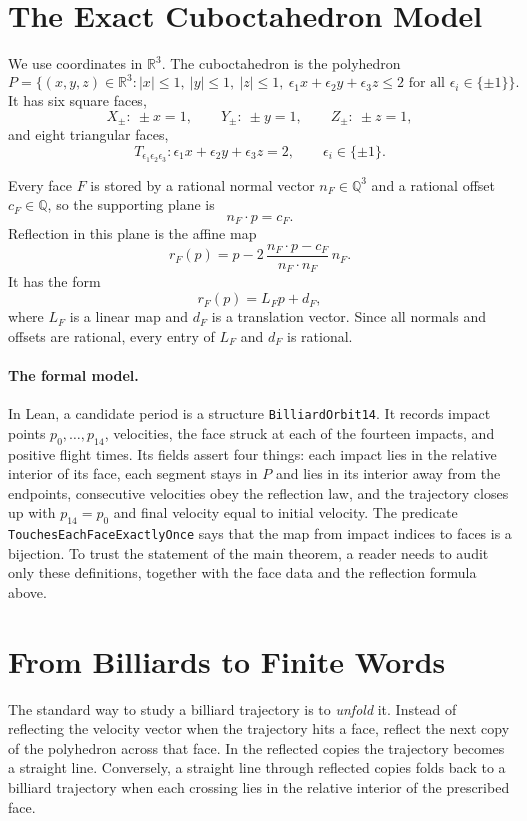 \documentclass[11pt]{article}
\newcommand{\R}{\mathbb{R}}
\newcommand{\Q}{\mathbb{Q}}
\newcommand{\dotp}{\mathbin{\cdot}}
\begin{document}
\section{The Exact Cuboctahedron Model}
\label{sec:model}

We use coordinates in \(\R^3\).  The cuboctahedron is the polyhedron
\[
P=\{(x,y,z)\in\R^3:
 |x|\le 1,\ |y|\le 1,\ |z|\le 1,\
 \epsilon_1x+\epsilon_2y+\epsilon_3z\le 2
 \text{ for all }\epsilon_i\in\{\pm1\}\}.
\]
It has six square faces,
\[
X_\pm:\ \pm x=1,\qquad
Y_\pm:\ \pm y=1,\qquad
Z_\pm:\ \pm z=1,
\]
and eight triangular faces,
\[
T_{\epsilon_1\epsilon_2\epsilon_3}:
\epsilon_1x+\epsilon_2y+\epsilon_3z=2,
\qquad \epsilon_i\in\{\pm1\}.
\]

Every face \(F\) is stored by a rational normal vector \(n_F\in\Q^3\) and a
rational offset \(c_F\in\Q\), so the supporting plane is
\[
  n_F\dotp p=c_F.
\]
Reflection in this plane is the affine map
\[
  r_F(p)=p-2\,\frac{n_F\dotp p-c_F}{n_F\dotp n_F}\,n_F.
\]
It has the form
\[
  r_F(p)=L_Fp+d_F,
\]
where \(L_F\) is a linear map and \(d_F\) is a translation vector.  Since all
normals and offsets are rational, every entry of \(L_F\) and \(d_F\) is
rational.

\paragraph{The formal model.}
In Lean, a candidate period is a structure \texttt{BilliardOrbit14}.  It
records impact points \(p_0,\ldots,p_{14}\), velocities, the face struck at
each of the fourteen impacts, and positive flight times.  Its fields assert
four things: each impact lies in the relative interior of its face, each
segment stays in \(P\) and lies in its interior away from the endpoints,
consecutive velocities obey the reflection law, and the trajectory closes up
with \(p_{14}=p_0\) and final velocity equal to initial velocity.  The
predicate \texttt{TouchesEachFaceExactlyOnce} says that the map from impact
indices to faces is a bijection.  To trust the statement of the main theorem,
a reader needs to audit only these definitions, together with the face data
and the reflection formula above.

\section{From Billiards to Finite Words}
\label{sec:words}

The standard way to study a billiard trajectory is to \emph{unfold} it.
Instead of reflecting the velocity vector when the trajectory hits a face,
reflect the next copy of the polyhedron across that face.  In the reflected
copies the trajectory becomes a straight line.  Conversely, a straight line
through reflected copies folds back to a billiard trajectory when each
crossing lies in the relative interior of the prescribed face.
\end{document}
